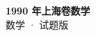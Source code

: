 \documentclass[zihao=-4, a4paper]{ctexart}
\begin{document}
\begin{center}
  {\Large\bfseries 1990 年上海卷数学}\\[4pt]
  {\large 数学 · 试题版}
\end{center}
\medskip
{}

\end{document}
